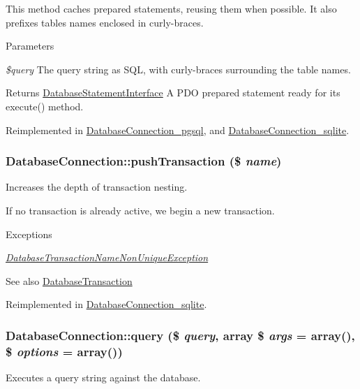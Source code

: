This method caches prepared statements, reusing them when possible. It also prefixes tables names enclosed in curly-\/braces.


\begin{DoxyParams}{Parameters}
\item[{\em \$query}]The query string as SQL, with curly-\/braces surrounding the table names.\end{DoxyParams}
\begin{DoxyReturn}{Returns}
\hyperlink{interfaceDatabaseStatementInterface}{DatabaseStatementInterface} A PDO prepared statement ready for its execute() method. 
\end{DoxyReturn}


Reimplemented in \hyperlink{classDatabaseConnection__pgsql_aa777c52e9403cc39e355ede640a5cb4a}{DatabaseConnection\_\-pgsql}, and \hyperlink{classDatabaseConnection__sqlite_aac5845cb92d937ec15f435043d014a8e}{DatabaseConnection\_\-sqlite}.\hypertarget{classDatabaseConnection_a3aa9a595dd90a2b64d6b6c187f25828a}{
\subsubsection[{pushTransaction}]{\setlength{\rightskip}{0pt plus 5cm}DatabaseConnection::pushTransaction (\$ {\em name})}}
\label{classDatabaseConnection_a3aa9a595dd90a2b64d6b6c187f25828a}
Increases the depth of transaction nesting.

If no transaction is already active, we begin a new transaction.


\begin{DoxyExceptions}{Exceptions}
\item[{\em \hyperlink{classDatabaseTransactionNameNonUniqueException}{DatabaseTransactionNameNonUniqueException}}]\end{DoxyExceptions}
\begin{DoxySeeAlso}{See also}
\hyperlink{classDatabaseTransaction}{DatabaseTransaction} 
\end{DoxySeeAlso}


Reimplemented in \hyperlink{classDatabaseConnection__sqlite_a00c6285d1c008b5aa496b046700f15a3}{DatabaseConnection\_\-sqlite}.\hypertarget{classDatabaseConnection_aff564097281c4496e9d10cb1bccbe98d}{
\subsubsection[{query}]{\setlength{\rightskip}{0pt plus 5cm}DatabaseConnection::query (\$ {\em query}, \/  array \$ {\em args} = {\ttfamily array()}, \/  \$ {\em options} = {\ttfamily array()})}}
\label{classDatabaseConnection_aff564097281c4496e9d10cb1bccbe98d}
Executes a query string against the database.

